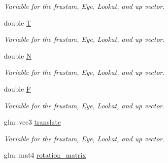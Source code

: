 \begin{DoxyCompactItemize}
\begin{DoxyCompactList}\small\item\em Variable for the frustum, Eye, Lookat, and up vector. \end{DoxyCompactList}\item 
double \hyperlink{classcft_1_1Scene_ae39672d7dbac20ac600f05d559d69805}{T}\hypertarget{classcft_1_1Scene_ae39672d7dbac20ac600f05d559d69805}{}\label{classcft_1_1Scene_ae39672d7dbac20ac600f05d559d69805}

\begin{DoxyCompactList}\small\item\em Variable for the frustum, Eye, Lookat, and up vector. \end{DoxyCompactList}\item 
double \hyperlink{classcft_1_1Scene_ae92b335cb5134ffa9df20bc441de0e32}{N}\hypertarget{classcft_1_1Scene_ae92b335cb5134ffa9df20bc441de0e32}{}\label{classcft_1_1Scene_ae92b335cb5134ffa9df20bc441de0e32}

\begin{DoxyCompactList}\small\item\em Variable for the frustum, Eye, Lookat, and up vector. \end{DoxyCompactList}\item 
double \hyperlink{classcft_1_1Scene_ab9dd8e93a0454019f2f2a2167503d075}{F}\hypertarget{classcft_1_1Scene_ab9dd8e93a0454019f2f2a2167503d075}{}\label{classcft_1_1Scene_ab9dd8e93a0454019f2f2a2167503d075}

\begin{DoxyCompactList}\small\item\em Variable for the frustum, Eye, Lookat, and up vector. \end{DoxyCompactList}\item 
glm\+::vec3 \hyperlink{classcft_1_1Scene_a58a6df7fd5277e8e9ca4e73bec0eb565}{translate}\hypertarget{classcft_1_1Scene_a58a6df7fd5277e8e9ca4e73bec0eb565}{}\label{classcft_1_1Scene_a58a6df7fd5277e8e9ca4e73bec0eb565}

\begin{DoxyCompactList}\small\item\em Variable for the frustum, Eye, Lookat, and up vector. \end{DoxyCompactList}\item 
glm\+::mat4 \hyperlink{classcft_1_1Scene_a54aeaffbd20e825e850ef38c1586e257}{rotation\+\_\+matrix}\hypertarget{classcft_1_1Scene_a54aeaffbd20e825e850ef38c1586e257}{}\label{classcft_1_1Scene_a54aeaffbd20e825e850ef38c1586e257}


\end{DoxyCompactItemize}
